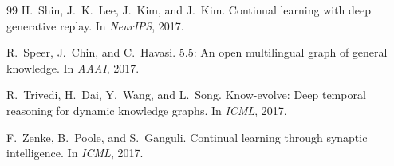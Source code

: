 \documentclass[11pt,a4paper]{article}
\theoremstyle{definition}
\begin{document}
\begin{thebibliography}{99}
H.~Shin, J.~K.~Lee, J.~Kim, and J.~Kim.
\newblock Continual learning with deep generative replay.
\newblock In \emph{NeurIPS}, 2017.

R.~Speer, J.~Chin, and C.~Havasi.
 5.5: An open multilingual graph of general knowledge.
\newblock In \emph{AAAI}, 2017.

R.~Trivedi, H.~Dai, Y.~Wang, and L.~Song.
\newblock Know-evolve: Deep temporal reasoning for dynamic knowledge graphs.
\newblock In \emph{ICML}, 2017.

F.~Zenke, B.~Poole, and S.~Ganguli.
\newblock Continual learning through synaptic intelligence.
\newblock In \emph{ICML}, 2017.

\end{thebibliography}
\end{document}

